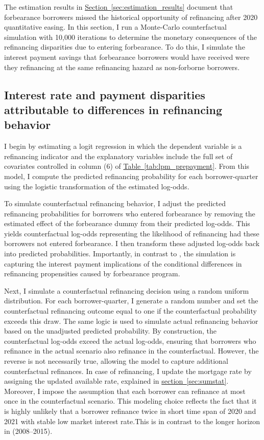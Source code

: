 \documentclass[11pt]{article}
\begin{document}
{The estimation results in \hyperref[sec:estimation_results]{Section~\ref{sec:estimation_results}} document that forbearance borrowers missed the historical opportunity of refinancing after 2020 quantitative easing. 
In this section, I run a Monte-Carlo counterfactual simulation
with 10,000 iterations to determine the monetary consequences of the refinancing
disparities due to entering forbearance.
To do this, I simulate the interest payment savings that
forbearance borrowers would have received were they refinancing at the same refinancing hazard
as non-forborne borrowers.  

\subsection{Interest rate and payment disparities attributable to differences in refinancing behavior}

I begin by estimating a logit regression in which the dependent variable is a refinancing indicator and the explanatory variables include the full set of covariates controlled in column (6) of \hyperlink{tab:lpm_prepayment}{Table~\ref{tab:lpm_prepayment}}. From this model, I compute the predicted refinancing probability for each borrower-quarter using the logistic transformation of the estimated log-odds.

To simulate counterfactual refinancing behavior, I adjust the predicted refinancing probabilities for borrowers who entered forbearance by removing the estimated effect of the forbearance dummy from their predicted log-odds. This yields counterfactual log-odds representing the likelihood of refinancing had these borrowers not entered forbearance. I then transform these adjusted log-odds back into predicted probabilities. Importantly, in contrast to \citet{gerardi2023mortgage}, the simulation is capturing
the interest payment implications of the conditional
differences in refinancing propensities caused by forbearance program. 

Next, I simulate a counterfactual refinancing decision using a random uniform distribution. For each borrower-quarter, I generate a random number and set the counterfactual refinancing outcome equal to one if the counterfactual probability exceeds this draw. The same logic is used to simulate actual refinancing behavior based on the unadjusted predicted probability. By construction, the counterfactual log-odds exceed the actual log-odds, ensuring that borrowers who refinance in the actual scenario also refinance in the counterfactual. However, the reverse is not necessarily true, allowing the model to capture additional counterfactual refinances. In case of refinancing, I update the mortgage rate by assigning the updated available rate, explained in \hyperref[sec:sumstat]{section~\ref{sec:sumstat}}.
Moreover, I impose the assumption that each borrower can refinance at most once in the counterfactual scenario. This modeling choice reflects the fact that it is highly unlikely that a borrower refinance twice in short time span of 2020 and 2021 with stable low market interest rate.This is in contrast to the longer horizon in \citet{gerardi2023mortgage} (2008–2015).

}
\end{document}
